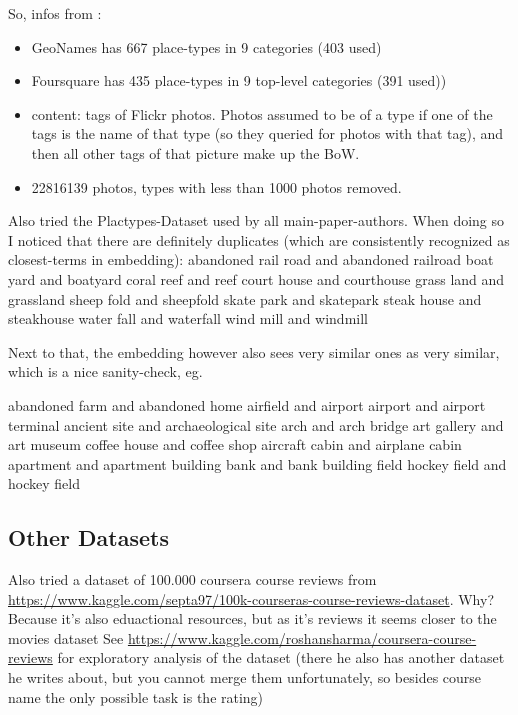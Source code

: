 
So, infos from \cite{Derrac2015}:
\begin{itemize}
	\item GeoNames has 667 place-types in 9 categories (403 used)
	\item Foursquare has 435 place-types in 9 top-level categories (391 used))
	\item content: tags of Flickr photos. Photos assumed to be of a type if one of the tags is the name of that type (so they queried for photos with that tag), and then all other tags of that picture make up the BoW.
	\item 22816139 photos, types with less than 1000 photos removed.
\end{itemize}


Also tried the Plactypes-Dataset used by all main-paper-authors. When doing so I noticed that there are definitely duplicates (which are consistently recognized as closest-terms in embedding):
  abandoned rail road and abandoned railroad
  boat yard and boatyard
  coral reef and reef
  court house and courthouse
  grass land and grassland
  sheep fold and sheepfold
  skate park and skatepark
  steak house and steakhouse
  water fall and waterfall
  wind mill and windmill

Next to that, the embedding however also sees very similar ones as very similar, which is a nice sanity-check, eg.

  abandoned farm and abandoned home
  airfield and airport
  airport and airport terminal
  ancient site and archaeological site
  arch and arch bridge
  art gallery and art museum
  coffee house and coffee shop
  aircraft cabin and airplane cabin
  apartment and apartment building
  bank and bank building
  field hockey field and hockey field

\subsection{Other Datasets}

Also tried a dataset of 100.000 coursera course reviews from \url{https://www.kaggle.com/septa97/100k-courseras-course-reviews-dataset}. Why? Because it's also eduactional resources, but as it's reviews it seems closer to the movies dataset
See \url{https://www.kaggle.com/roshansharma/coursera-course-reviews} for exploratory analysis of the dataset (there he also has another dataset he writes about, but you cannot merge them unfortunately, so besides course name the only possible task is the rating)

